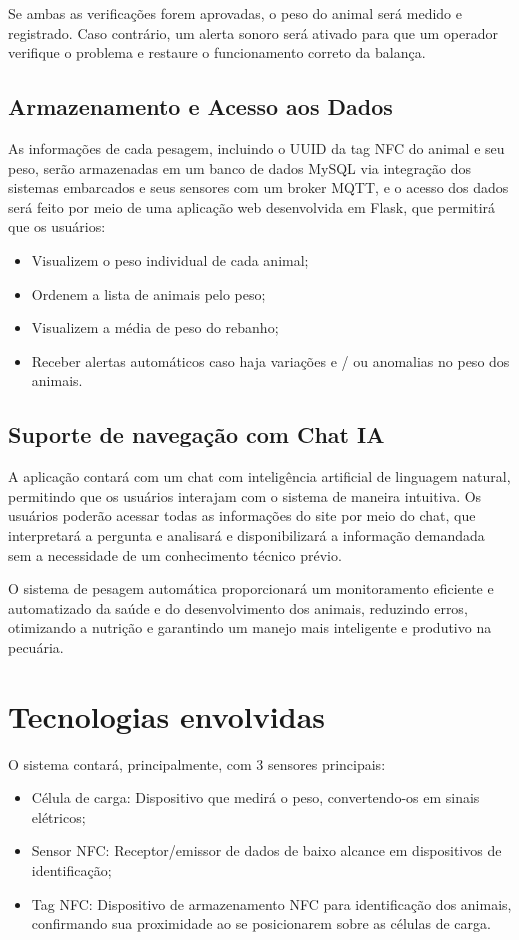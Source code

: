 \documentclass[11pt]{article}
\begin{document}
Se ambas as verificações forem aprovadas, o peso do animal será medido e registrado. Caso contrário, um alerta sonoro será ativado para que um operador verifique o problema e restaure o funcionamento correto da balança.

\subsection{Armazenamento e Acesso aos Dados}
As informações de cada pesagem, incluindo o UUID da tag NFC do animal e seu peso, serão armazenadas em um banco de dados MySQL via integração dos sistemas embarcados e seus sensores com um broker MQTT, e o acesso dos dados será feito por meio de uma aplicação web desenvolvida em Flask, que permitirá que os usuários:

\begin{itemize}
    \item Visualizem o peso individual de cada animal;
    \item Ordenem a lista de animais pelo peso;
    \item Visualizem a média de peso do rebanho;
    \item Receber alertas automáticos caso haja variações e / ou anomalias no peso dos animais.
\end{itemize}

\subsection{Suporte de navegação com Chat IA}
A aplicação contará com um chat com inteligência artificial de linguagem natural, permitindo que os usuários interajam com o sistema de maneira intuitiva. Os usuários poderão acessar todas as informações do site por meio do chat, que interpretará a pergunta e analisará e disponibilizará a informação demandada sem a necessidade de um conhecimento técnico prévio.

O sistema de pesagem automática proporcionará um monitoramento eficiente e automatizado da saúde e do desenvolvimento dos animais, reduzindo erros, otimizando a nutrição e garantindo um manejo mais inteligente e produtivo na pecuária.

\section{Tecnologias envolvidas}
O sistema contará, principalmente, com 3 sensores principais:
\begin{itemize}
    \item Célula de carga: Dispositivo que medirá o peso, convertendo-os em sinais elétricos;
    \item Sensor NFC: Receptor/emissor de dados de baixo alcance em dispositivos de identificação;
    \item Tag NFC: Dispositivo de armazenamento NFC para identificação dos animais, confirmando sua proximidade ao se posicionarem sobre as células de carga.
\end{itemize}
\end{document}
